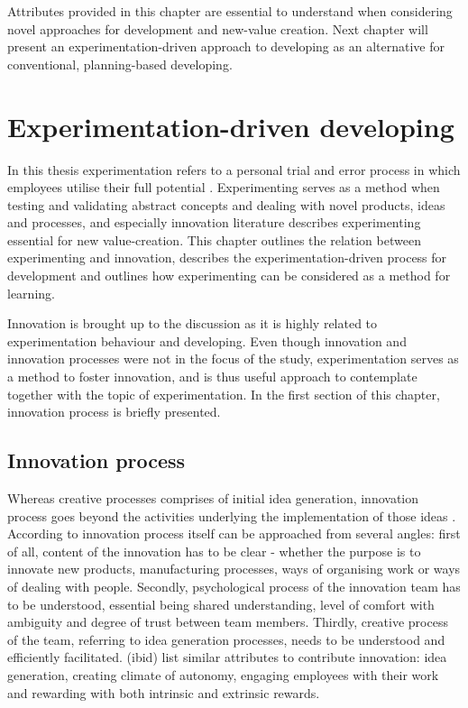 Attributes provided in this chapter are essential to understand when considering novel approaches for development and new-value creation. Next chapter will present an experimentation-driven approach to developing as an alternative for conventional, planning-based developing. 
 
\chapter{Experimentation-driven developing}
In this thesis experimentation refers to a personal trial and error process in which employees utilise their full potential \citep{andriopoulos2000enhancing}. Experimenting serves as a method when testing and validating abstract concepts \citep{kolb1984experiential} and dealing with novel products, ideas and processes, and especially innovation literature describes experimenting essential for new value-creation. This chapter outlines the relation between experimenting and innovation, describes the experimentation-driven process for development and outlines how experimenting can be considered as a method for learning. 

Innovation is brought up to the discussion as it is highly related to experimentation behaviour and developing. Even though innovation and innovation processes were not in the focus of the study, experimentation serves as a method to foster innovation, and is thus useful approach to contemplate together with the topic of experimentation. In the first section of this chapter, innovation process is briefly presented. 

\section{Innovation process}
Whereas creative processes comprises of initial idea generation, innovation process goes beyond the activities underlying the implementation of those ideas \citep{vincent2002divergent}. According to \citet{buijs2007innovation} innovation process itself can be approached from several angles: first of all, content of the innovation has to be clear - whether the purpose is to innovate new products, manufacturing processes, ways of organising work or ways of dealing with people. Secondly, psychological process of the innovation team has to be understood, essential being shared understanding, level of comfort with ambiguity and degree of trust between team members. Thirdly, creative process of the team, referring to idea generation processes, needs to be understood and efficiently facilitated. (ibid) \citet{amabile1996assessing} list similar attributes to contribute innovation: idea generation, creating climate of autonomy, engaging employees with their work and rewarding with both intrinsic and extrinsic rewards. 

